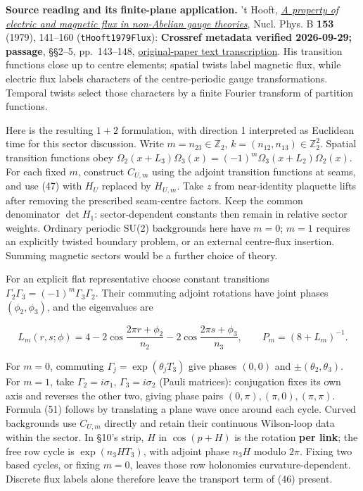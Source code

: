 \documentclass[11pt,a4paper]{article}
\begin{document}
\textbf{Source reading and its finite-plane application.} 't Hooft,
\href{https://doi.org/10.1016/0550-3213(79)90595-9}{\emph{A property of
electric and magnetic flux in non-Abelian gauge theories}}, Nucl. Phys.
B \textbf{153} (1979), 141--160 (\texttt{tHooft1979Flux}):
\textbf{Crossref metadata verified 2026-09-29; passage}, §§2--5,
pp.~143--148,
\href{https://studyres.com/doc/2086823/a-property-of-electric-and-magnetic-flux-in-non}{original-paper
text transcription}. His transition functions close up to centre
elements; spatial twists label magnetic flux, while electric flux labels
characters of the centre-periodic gauge transformations. Temporal twists
select those characters by a finite Fourier transform of partition
functions.

Here is the resulting \(1+2\) formulation, with direction 1 interpreted
as Euclidean time for this sector discussion. Write
\(m=n_{23}\in\mathbb Z_2\), \(k=(n_{12},n_{13})\in\mathbb Z_2^2\).
Spatial transition functions obey
\(\Omega_2(x+L_3)\Omega_3(x)=(-1)^m\Omega_3(x+L_2)\Omega_2(x)\). For
each fixed \(m\), construct \(C_{U,m}\) using the adjoint transition
functions at seams, and use (47) with \(H_U\) replaced by \(H_{U,m}\).
Take \(z\) from near-identity plaquette lifts after removing the
prescribed seam-centre factors. Keep the common denominator
\(\det H_1\): sector-dependent constants then remain in relative sector
weights. Ordinary periodic SU(2) backgrounds here have \(m=0\); \(m=1\)
requires an explicitly twisted boundary problem, or an external
centre-flux insertion. Summing magnetic sectors would be a further
choice of theory.

For an explicit flat representative choose constant transitions
\(\Gamma_2\Gamma_3=(-1)^m\Gamma_3\Gamma_2\). Their commuting adjoint
rotations have joint phases \((\phi_2,\phi_3)\), and the eigenvalues are

\[L_m(r,s;\phi)=4-2\cos\frac{2\pi r+\phi_2}{n_2}
-2\cos\frac{2\pi s+\phi_3}{n_3},\qquad P_m=(8+L_m)^{-1}.\tag{51}\]

For \(m=0\), commuting \(\Gamma_j=\exp(\theta_jT_3)\) give phases
\((0,0)\) and \(\pm(\theta_2,\theta_3)\). For \(m=1\), take
\(\Gamma_2=i\sigma_1\), \(\Gamma_3=i\sigma_2\) (Pauli matrices):
conjugation fixes its own axis and reverses the other two, giving phase
pairs \((0,\pi),(\pi,0),(\pi,\pi)\). Formula (51) follows by translating
a plane wave once around each cycle. Curved backgrounds use \(C_{U,m}\)
directly and retain their continuous Wilson-loop data within the sector.
In §10's strip, \(H\) in \(\cos(p+H)\) is the rotation \textbf{per
link}; the free row cycle is \(\exp(n_3HT_3)\), with adjoint phase
\(n_3H\) modulo \(2\pi\). Fixing two based cycles, or fixing \(m=0\),
leaves those row holonomies curvature-dependent. Discrete flux labels
alone therefore leave the transport term of (46) present.
\end{document}
